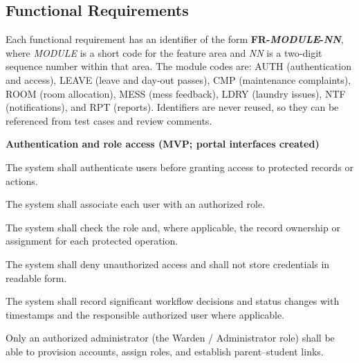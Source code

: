 \documentclass[11pt,a4paper]{article}
\numberwithin{figure}{section}   %
\begin{document}
\subsection{Functional Requirements}
Each functional requirement has an identifier of the form \textbf{FR-\textit{MODULE}-\textit{NN}}, where \textit{MODULE} is a short code for the feature area and \textit{NN} is a two-digit sequence number within that area. The module codes are: AUTH (authentication and access), LEAVE (leave and day-out passes), CMP (maintenance complaints), ROOM (room allocation), MESS (mess feedback), LDRY (laundry issues), NTF (notifications), and RPT (reports). Identifiers are never reused, so they can be referenced from test cases and review comments.

\textbf{Authentication and role access (MVP; portal interfaces created)}
\begin{description}[style=sameline,leftmargin=3.0cm,labelwidth=2.8cm,labelsep=0.2cm,font=\bfseries\small,itemsep=3pt]
\item[FR-AUTH-01] The system shall authenticate users before granting access to protected records or actions.
\item[FR-AUTH-02] The system shall associate each user with an authorized role.
\item[FR-AUTH-03] The system shall check the role and, where applicable, the record ownership or assignment for each protected operation.
\item[FR-AUTH-04] The system shall deny unauthorized access and shall not store credentials in readable form.
\item[FR-AUTH-05] The system shall record significant workflow decisions and status changes with timestamps and the responsible authorized user where applicable.
\item[FR-AUTH-06] Only an authorized administrator (the Warden / Administrator role) shall be able to provision accounts, assign roles, and establish parent--student links.
\end{description}
\end{document}
